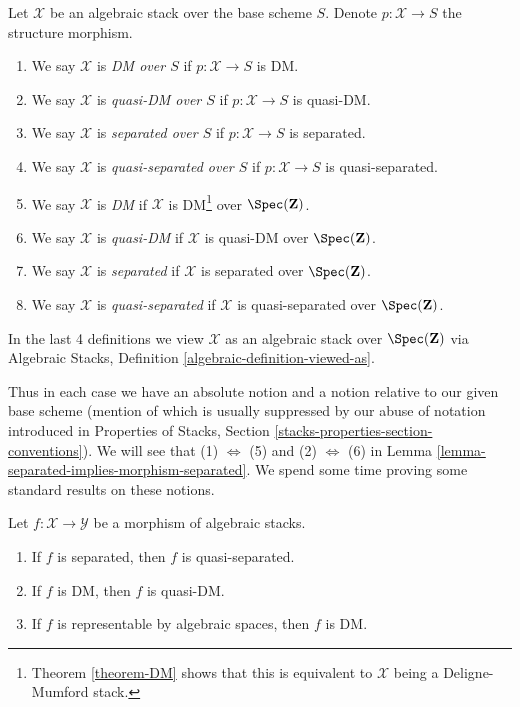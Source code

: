 \begin{definition}
\label{definition-absolute-separated}
Let $\mathcal{X}$ be an algebraic stack over the base scheme $S$.
Denote $p : \mathcal{X} \to S$ the structure morphism.
\begin{enumerate}
\item We say $\mathcal{X}$ is {\it DM over $S$}
if $p : \mathcal{X} \to S$ is DM.
\item We say $\mathcal{X}$ is {\it quasi-DM over $S$}
if $p : \mathcal{X} \to S$ is quasi-DM.
\item We say $\mathcal{X}$ is {\it separated over $S$}
if $p : \mathcal{X} \to S$ is separated.
\item We say $\mathcal{X}$ is {\it quasi-separated over $S$} if
$p : \mathcal{X} \to S$ is quasi-separated.
\item We say $\mathcal{X}$ is {\it DM}
if $\mathcal{X}$ is DM\footnote{Theorem \ref{theorem-DM} shows
that this is equivalent to $\mathcal{X}$ being a Deligne-Mumford stack.}
over $\Spec(\mathbf{Z})$.
\item We say $\mathcal{X}$ is {\it quasi-DM}
if $\mathcal{X}$ is quasi-DM over $\Spec(\mathbf{Z})$.
\item We say $\mathcal{X}$ is {\it separated} if $\mathcal{X}$
is separated over $\Spec(\mathbf{Z})$.
\item We say $\mathcal{X}$ is {\it quasi-separated} if $\mathcal{X}$
is quasi-separated over $\Spec(\mathbf{Z})$.
\end{enumerate}
In the last 4 definitions we view $\mathcal{X}$
as an algebraic stack over $\Spec(\mathbf{Z})$
via
Algebraic Stacks, Definition \ref{algebraic-definition-viewed-as}.
\end{definition}

\noindent
Thus in each case we have an absolute notion and a notion relative to
our given base scheme (mention of which is usually suppressed by our
abuse of notation introduced in
Properties of Stacks, Section \ref{stacks-properties-section-conventions}).
We will see that (1) $\Leftrightarrow$ (5) and (2) $\Leftrightarrow$ (6) in
Lemma \ref{lemma-separated-implies-morphism-separated}.
We spend some time proving some standard results on these notions.

\begin{lemma}
\label{lemma-trivial-implications}
Let $f : \mathcal{X} \to \mathcal{Y}$ be a morphism of algebraic stacks.
\begin{enumerate}
\item If $f$ is separated, then $f$ is quasi-separated.
\item If $f$ is DM, then $f$ is quasi-DM.
\item If $f$ is representable by algebraic spaces, then $f$ is DM.
\end{enumerate}
\end{lemma}

